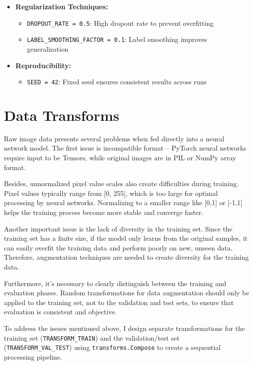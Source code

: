 \documentclass[12pt, a4paper, openany]{report}
\begin{document}
\begin{itemize}
\begin{itemize}
     \end{itemize}
     \item \textbf{Regularization Techniques:} %
     \begin{itemize}
         \item \texttt{DROPOUT\_RATE = 0.5}: High dropout rate to prevent overfitting %
         \item \texttt{LABEL\_SMOOTHING\_FACTOR = 0.1}: Label smoothing improves generalization %
     \end{itemize}
     \item \textbf{Reproducibility:} %
     \begin{itemize}
         \item \texttt{SEED = 42}: Fixed seed ensures consistent results across runs %
     \end{itemize}
 \end{itemize}

 \section{Data Transforms} %
 Raw image data presents several problems when fed directly into a neural network model. The first issue is incompatible format – PyTorch neural networks require input to be Tensors, while original images are in PIL or NumPy array format.

 Besides, unnormalized pixel value scales also create difficulties during training. Pixel values typically range from [0, 255], which is too large for optimal processing by neural networks. Normalizing to a smaller range like [0,1] or [-1,1] helps the training process become more stable and converge faster.

 Another important issue is the lack of diversity in the training set. Since the training set has a finite size, if the model only learns from the original samples, it can easily overfit the training data and perform poorly on new, unseen data. Therefore, augmentation techniques are needed to create diversity for the training data.

 Furthermore, it's necessary to clearly distinguish between the training and evaluation phases. Random transformations for data augmentation should only be applied to the training set, not to the validation and test sets, to ensure that evaluation is consistent and objective.

 To address the issues mentioned above, I design separate transformations for the training set (\texttt{TRANSFORM\_TRAIN}) and the validation/test set (\texttt{TRANSFORM\_VAL\_TEST}) using \texttt{transforms.Compose} to create a sequential processing pipeline.
\end{document}

